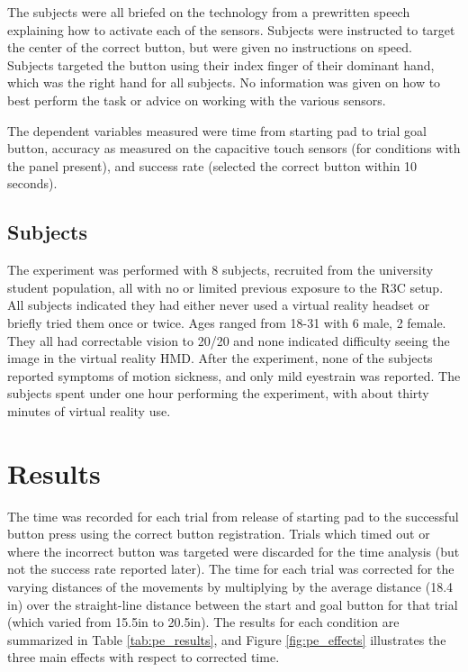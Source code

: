 The subjects were all briefed on the technology from a prewritten speech explaining how to activate each of the sensors.
Subjects were instructed to target the center of the correct button, but were given no instructions on speed.
Subjects targeted the button using their index finger of their dominant hand, which was the right hand for all subjects.
No information was given on how to best perform the task or advice on working with the various sensors.

The dependent variables measured were time from starting pad to trial goal button, accuracy as measured on the capacitive touch sensors (for conditions with the panel present), and success rate (selected the correct button within 10 seconds).


\subsection{Subjects}
The experiment was performed with 8 subjects, recruited from the university student population, all with no or limited previous exposure to the R3C setup.
All subjects indicated they had either never used a virtual reality headset or briefly tried them once or twice.
Ages ranged from 18-31 with 6 male, 2 female.
They all had correctable vision to 20/20 and none indicated difficulty seeing the image in the virtual reality HMD.
After the experiment, none of the subjects reported symptoms of motion sickness, and only mild eyestrain was reported.
The subjects spent under one hour performing the experiment, with about thirty minutes of virtual reality use.

\section{Results}

The time was recorded for each trial from release of starting pad to the successful button press using the correct button registration.
Trials which timed out or where the incorrect button was targeted were discarded for the time analysis (but not the success rate reported later).
The time for each trial was corrected for the varying distances of the movements by multiplying by the average distance (18.4 in) over the straight-line distance between the start and goal button for that trial (which varied from 15.5in to 20.5in).
The results for each condition are summarized in Table \ref{tab:pe_results}, and Figure \ref{fig:pe_effects} illustrates the three main effects with respect to corrected time.

